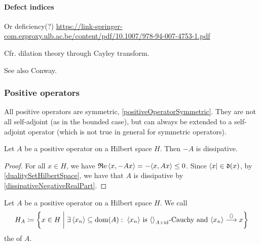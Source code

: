 \paragraph{Defect indices}
Or deficiency(?)
\url{https://link-springer-com.ezproxy.ulb.ac.be/content/pdf/10.1007/978-94-007-4753-1.pdf}

Cfr. dilation theory through Cayley transform.

See also Conway.

\subsubsection{Positive operators}
All positive operators are symmetric, \ref{positiveOperatorSymmetric}. They are not all self-adjoint (as in the bounded case), but can always be extended to a self-adjoint operator (which is not true in general for symmetric operators).

\begin{lemma} \label{negativeOperatorsDissipative}
Let $A$ be a positive operator on a Hilbert space $H$. Then $-A$ is dissipative.
\end{lemma}
\begin{proof}
For all $x\in H$, we have $\Re\inner{x,-Ax} = -\inner{x,Ax} \leq 0$. Since $\left\langle x \right| \in \operatorname{\mathfrak{d}}(x)$, by \ref{dualitySetHilbertSpace}, we have that $A$ is dissipative by \ref{dissipativeNegativeRealPart}.
\end{proof}

\begin{definition}
Let $A$ be a positive operator on a Hilbert space $H$. We call
\[ H_A \defeq \setbuilder{x\in H}{\exists \seq{x_n}\subseteq \dom(A): \; \text{$\seq{x_n}$ is $\inner{}_{A+\id}$-Cauchy and $\seq{x_n}\overset{\inner{}}{\longrightarrow} x$}} \]
the  of $A$.
\end{definition}

